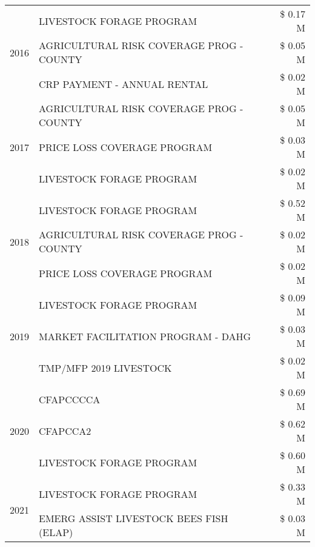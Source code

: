\begin{tabular}{llr}
\cline{1-3}
\multirow[t]{3}{*}{2016} & LIVESTOCK FORAGE PROGRAM & \$ 0.17 M \\
 & AGRICULTURAL RISK COVERAGE PROG - COUNTY & \$ 0.05 M \\
 & CRP PAYMENT - ANNUAL RENTAL & \$ 0.02 M \\
\cline{1-3}
\multirow[t]{3}{*}{2017} & AGRICULTURAL RISK COVERAGE PROG - COUNTY & \$ 0.05 M \\
 & PRICE LOSS COVERAGE PROGRAM & \$ 0.03 M \\
 & LIVESTOCK FORAGE PROGRAM & \$ 0.02 M \\
\cline{1-3}
\multirow[t]{3}{*}{2018} & LIVESTOCK FORAGE PROGRAM & \$ 0.52 M \\
 & AGRICULTURAL RISK COVERAGE PROG - COUNTY & \$ 0.02 M \\
 & PRICE LOSS COVERAGE PROGRAM & \$ 0.02 M \\
\cline{1-3}
\multirow[t]{3}{*}{2019} & LIVESTOCK FORAGE PROGRAM & \$ 0.09 M \\
 & MARKET FACILITATION PROGRAM - DAHG & \$ 0.03 M \\
 & TMP/MFP 2019 LIVESTOCK & \$ 0.02 M \\
\cline{1-3}
\multirow[t]{3}{*}{2020} & CFAPCCCCA & \$ 0.69 M \\
 & CFAPCCA2 & \$ 0.62 M \\
 & LIVESTOCK FORAGE PROGRAM & \$ 0.60 M \\
\cline{1-3}
\multirow[t]{2}{*}{2021} & LIVESTOCK FORAGE PROGRAM & \$ 0.33 M \\
 & EMERG ASSIST LIVESTOCK BEES FISH (ELAP) & \$ 0.03 M \\
\cline{1-3}
\bottomrule
\end{tabular}
